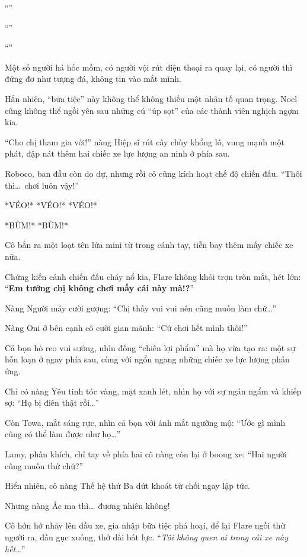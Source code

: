\documentclass[../main.tex]{subfiles}
\begin{document}
``''

``''

``''

Một số người há hốc mồm, có người vội rút điện thoại ra quay lại, có người thì đứng đơ như tượng đá, không tin vào mắt mình.

Hẳn nhiên, ``bữa tiệc'' này không thể không thiếu một nhân tố quan trọng. Noel cũng không thể ngồi yên sau những cú ``úp sọt'' của các thành viên nghịch ngợm kia.

``Cho chị tham gia với!'' nàng Hiệp sĩ rút cây chùy khổng lồ, vung mạnh một phát, đập nát thêm hai chiếc xe lực lượng an ninh ở phía sau.

Roboco, ban đầu còn do dự, nhưng rồi cô cũng kích hoạt chế độ chiến đấu. ``Thôi thì\dots\ chơi luôn vậy!''

*VÉO!* *VÉO!* *VÉO!*

*BÙM!* *BÙM!*

Cô bắn ra một loạt tên lửa mini  từ trong cánh tay, tiễn bay thêm mấy chiếc xe nữa.

Chứng kiến cảnh chiến đấu cháy nổ kia, Flare không khỏi trợn tròn mắt, hét lớn: ``\textbf{Em tưởng chị không chơi mấy cái này mà!?}''

Nàng Người máy cười gượng: ``Chị thấy vui vui nên cũng muốn làm chứ\dots''

Nàng Oni ở bên cạnh cô cười gian mãnh: ``Cứ chơi hết mình thôi!''

Cả bọn hò reo vui sướng, nhìn đống ``chiến lợi phẩm'' mà họ vừa tạo ra: một sự hỗn loạn ở ngay phía sau, cùng với ngổn ngang những chiếc xe lực lượng phản ứng.

Chỉ có nàng Yêu tinh tóc vàng, mặt xanh lét, nhìn họ với sự ngán ngẩm và khiếp sợ: ``Họ bị điên thật rồi\dots''

Còn Towa, mắt sáng rực, nhìn cả bọn với ánh mắt ngưỡng mộ: ``Ước gì mình cũng có thể làm được như họ\dots''

Lamy, phấn khích, chỉ tay về phía hai cô nàng còn lại ở boong xe: ``Hai người cũng muốn thử chứ?''

Hiển nhiên, cô nàng Thế hệ thứ Ba dứt khoát từ chối ngay lập tức.

Nhưng nàng Ác ma thì\dots\ đương nhiên không!

Cô hớn hở nhảy lên đầu xe, gia nhập bữa tiệc phá hoại, để lại Flare ngồi thừ người ra, đầu gục xuống, thở dài bất lực. ``\textit{Tôi không quen ai trong cái xe này hết\dots}''
\end{document}
